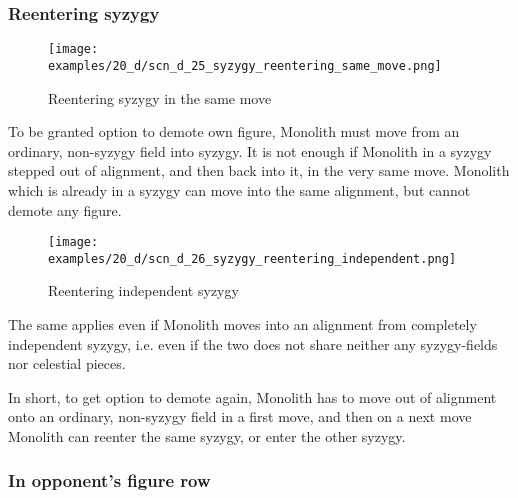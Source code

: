 \clearpage %

\subsubsection*{Reentering syzygy}
\label{sec:Discovery/Monolith/Syzygy/Reentering syzygy}

\vspace*{-1.4\baselineskip}
\noindent
\begin{figure}[!h]
\texttt{[image: examples/20\_d/scn\_d\_25\_syzygy\_reentering\_same\_move.png]}
\caption{Reentering syzygy in the same move}
\label{fig:scn_d_25_syzygy_reentering_same_move}
\end{figure}

To be granted option to demote own figure, Monolith must move from an ordinary, non-syzygy field into syzygy. It is
not enough if Monolith in a syzygy stepped out of alignment, and then back into it, in the very same move. Monolith
which is already in a syzygy can move into the same alignment, but cannot demote any figure.

\clearpage %

\noindent
\begin{figure}[!h]
\texttt{[image: examples/20\_d/scn\_d\_26\_syzygy\_reentering\_independent.png]}
\caption{Reentering independent syzygy}
\label{fig:scn_d_26_syzygy_reentering_independent}
\end{figure}

The same applies even if Monolith moves into an alignment from completely independent syzygy, i.e. even if the two does
not share neither any syzygy-fields nor celestial pieces.

In short, to get option to demote again, Monolith has to move out of alignment onto an ordinary, non-syzygy field in a
first move, and then on a next move Monolith can reenter the same syzygy, or enter the other syzygy.

\clearpage %

\subsubsection*{In opponent's figure row}
\label{sec:Discovery/Monolith/Syzygy/In opponent's figure row}

